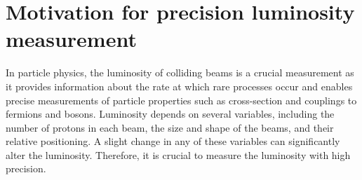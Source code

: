 \section{Motivation for precision luminosity measurement}


In particle physics, the luminosity of colliding beams is a crucial measurement as it provides information about the rate at which rare processes occur and enables precise measurements of particle properties such as cross-section and couplings to fermions and bosons. Luminosity depends on several variables, including the number of protons in each beam, the size and shape of the beams, and their relative positioning. A slight change in any of these variables can significantly alter the luminosity.
Therefore, it is crucial to measure the luminosity with high precision.

